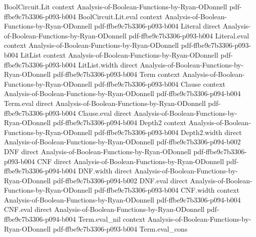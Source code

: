 \begin{lemma}
\label{BooleanAnalysis.derivative_add}
\leanok
{}
\proofstep
  {BoolCircuit.Lit}
  {context}
  {Analysis-of-Boolean-Functions-by-Ryan-ODonnell}
  {pdf-ffbe9c7b3306-p093-b004}
\proofstep
  {BoolCircuit.Lit.eval}
  {context}
  {Analysis-of-Boolean-Functions-by-Ryan-ODonnell}
  {pdf-ffbe9c7b3306-p093-b004}
\proofstep
  {Literal}
  {direct}
  {Analysis-of-Boolean-Functions-by-Ryan-ODonnell}
  {pdf-ffbe9c7b3306-p093-b004}
\proofstep
  {Literal.eval}
  {context}
  {Analysis-of-Boolean-Functions-by-Ryan-ODonnell}
  {pdf-ffbe9c7b3306-p093-b004}
\proofstep
  {LitList}
  {context}
  {Analysis-of-Boolean-Functions-by-Ryan-ODonnell}
  {pdf-ffbe9c7b3306-p093-b004}
\proofstep
  {LitList.width}
  {direct}
  {Analysis-of-Boolean-Functions-by-Ryan-ODonnell}
  {pdf-ffbe9c7b3306-p093-b004}
\proofstep
  {Term}
  {context}
  {Analysis-of-Boolean-Functions-by-Ryan-ODonnell}
  {pdf-ffbe9c7b3306-p093-b004}
\proofstep
  {Clause}
  {context}
  {Analysis-of-Boolean-Functions-by-Ryan-ODonnell}
  {pdf-ffbe9c7b3306-p094-b004}
\proofstep
  {Term.eval}
  {direct}
  {Analysis-of-Boolean-Functions-by-Ryan-ODonnell}
  {pdf-ffbe9c7b3306-p093-b004}
\proofstep
  {Clause.eval}
  {direct}
  {Analysis-of-Boolean-Functions-by-Ryan-ODonnell}
  {pdf-ffbe9c7b3306-p094-b004}
\proofstep
  {Depth2}
  {context}
  {Analysis-of-Boolean-Functions-by-Ryan-ODonnell}
  {pdf-ffbe9c7b3306-p093-b004}
\proofstep
  {Depth2.width}
  {direct}
  {Analysis-of-Boolean-Functions-by-Ryan-ODonnell}
  {pdf-ffbe9c7b3306-p094-b002}
\proofstep
  {DNF}
  {direct}
  {Analysis-of-Boolean-Functions-by-Ryan-ODonnell}
  {pdf-ffbe9c7b3306-p093-b004}
\proofstep
  {CNF}
  {direct}
  {Analysis-of-Boolean-Functions-by-Ryan-ODonnell}
  {pdf-ffbe9c7b3306-p094-b004}
\proofstep
  {DNF.width}
  {direct}
  {Analysis-of-Boolean-Functions-by-Ryan-ODonnell}
  {pdf-ffbe9c7b3306-p094-b002}
\proofstep
  {DNF.eval}
  {direct}
  {Analysis-of-Boolean-Functions-by-Ryan-ODonnell}
  {pdf-ffbe9c7b3306-p093-b004}
\proofstep
  {CNF.width}
  {context}
  {Analysis-of-Boolean-Functions-by-Ryan-ODonnell}
  {pdf-ffbe9c7b3306-p094-b004}
\proofstep
  {CNF.eval}
  {direct}
  {Analysis-of-Boolean-Functions-by-Ryan-ODonnell}
  {pdf-ffbe9c7b3306-p094-b004}
\proofstep
  {Term.eval_nil}
  {context}
  {Analysis-of-Boolean-Functions-by-Ryan-ODonnell}
  {pdf-ffbe9c7b3306-p093-b004}
\proofstep
  {Term.eval_cons}

\end{lemma}
